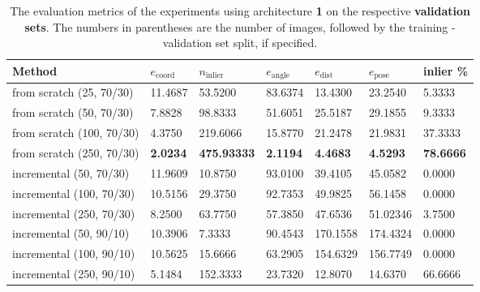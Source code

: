 \begin{table}[!b]
\centering
\begin{tabular}{l||llllll} 
Method                   & $e_{\text{coord}}$ & $n_{\text{inlier}}$ & $e_{\text{angle}}$ & $e_{\text{dist}}$ & $e_{\text{pose}}$  & inlier \% \\ \hline \hline 
from scratch (25, 70/30)        & 11.4687            & 53.5200             & 83.6374            & 13.4300           & 23.2540  & 5.3333          \\ \hline
from scratch (50, 70/30)        & 7.8828             & 98.8333             & 51.6051            & 25.5187           & 29.1855 & 9.3333          \\ \hline 
from scratch (100, 70/30)       & 4.3750             & 219.6066            & 15.8770            & 21.2478            & 21.9831    &37.3333       \\ \hline
from scratch (250, 70/30)       & \textbf{2.0234}    & \textbf{475.93333}  & \textbf{2.1194}   &\textbf{4.4683}    & \textbf{4.5293} & \textbf{78.6666}            \\ \hline \hline
incremental (50, 70/30)  & 11.9609            & 10.8750            & 93.0100           & 39.4105           & 45.0582  &0.0000          \\ \hline
incremental (100, 70/30) & 10.5156            & 29.3750             & 92.7353           & 49.9825           & 56.1458  &0.0000         \\ \hline 
incremental (250, 70/30) & 8.2500             & 63.7750             & 57.3850             & 47.6536           & 51.02346 & 3.7500       \\ \hline \hline
incremental (50, 90/10)  & 10.3906            & 7.3333                   & 90.4543           & 170.1558           & 174.4324  &0.0000        \\ \hline 
incremental (100, 90/10) & 10.5625             & 15.6666                  & 63.2905            & 154.6329          & 156.7749  &0.0000        \\ \hline
incremental (250, 90/10) & 5.1484             & 152.3333                 & 23.7320            & 12.8070            &  14.6370   & 66.6666      
\end{tabular}
\caption{The evaluation metrics of the experiments using architecture \textbf{1} on the respective \textbf{validation sets}. The numbers in parentheses are the number of images, followed by the training - validation set split, if specified.}
\label{table:experiments_online_sratch_arch1}
\end{table}

